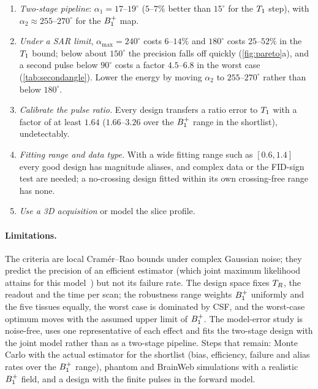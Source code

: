 \begin{enumerate}
  $1$\,ms $330^\circ$ pulse bias $\Tone$ by $2$--$20\%$, most where the scan-2 angle passes $330$--$350^\circ$, which every
  design with $\alpha_2\ge254^\circ$ does somewhere in $[0.7,1.3]$.
\item \emph{Two-stage pipeline}: $\alpha_1=17$--$19^\circ$ ($5$--$7\%$ better than $15^\circ$ for the $\Tone$ step), with
  $\alpha_2\approx255$--$270^\circ$ for the $B_1^{+}$ map.
\item \emph{Under a SAR limit}, $\alpha_{\max}=240^\circ$ costs $6$--$14\%$ and $180^\circ$ costs $25$--$52\%$ in the $\Tone$ bound;
  below about $150^\circ$ the precision falls off quickly (\cref{fig:pareto}a), and a second pulse below $90^\circ$
  costs a factor $4.5$--$6.8$ in the worst case (\cref{tab:secondangle}). Lower the energy by moving $\alpha_2$ to
  $255$--$270^\circ$ rather than below $180^\circ$.
\item \emph{Calibrate the pulse ratio.} Every design transfers a ratio error to $\Tone$ with a factor of at
  least $1.64$ ($1.66$--$3.26$ over the $B_1^{+}$ range in the shortlist), undetectably.
\item \emph{Fitting range and data type.} With a wide fitting range such as $[0.6,1.4]$ every good design
  has magnitude aliases, and complex data or the FID-sign test are needed; a no-crossing design
  fitted within its own crossing-free range has none.
\item \emph{Use a 3D acquisition} or model the slice profile.
\end{enumerate}

\paragraph{Limitations.} The criteria are local Cram\'er--Rao bounds under complex Gaussian
noise; they predict the precision of an efficient estimator (which joint maximum likelihood
attains for this model~\cite{technote}) but not its failure rate. The design space fixes $T_R$, the
readout and the time per scan; the robustness range weights $B_1^{+}$ uniformly and the five tissues
equally, the worst case is dominated by CSF, and the worst-case optimum moves with the assumed
upper limit of $B_1^{+}$. The model-error study is noise-free, uses one representative of each effect
and fits the two-stage design with the joint model rather than as a two-stage pipeline. Steps that
remain: Monte Carlo with the actual estimator for the shortlist (bias, efficiency, failure and alias
rates over the $B_1^{+}$ range), phantom and BrainWeb simulations with a realistic $B_1^{+}$ field, and a design
with the finite pulses in the forward model.
